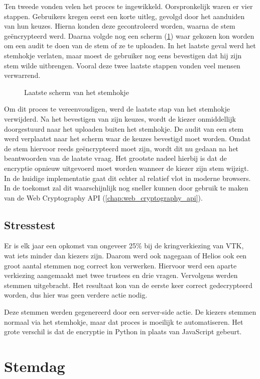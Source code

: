 \npar Ten tweede vonden velen het proces te ingewikkeld. Oorspronkelijk waren er vier stappen. Gebruikers kregen eerst een korte uitleg, gevolgd door het aanduiden van hun keuzes. Hierna konden deze gecontroleerd worden, waarna de stem ge\"encrypteerd werd. Daarna volgde nog een scherm (\ref{fig:kv:booth_submit}) waar gekozen kon worden om een audit te doen van de stem of ze te uploaden. In het laatste geval werd het stemhokje verlaten, maar moest de gebruiker nog eens bevestigen dat hij zijn stem wilde uitbrengen. Vooral deze twee laatste stappen vonden veel mensen verwarrend.

\begin{figure}
  \caption{Laatste scherm van het stemhokje}
  \label{fig:kv:booth_submit}
\end{figure}

\npar Om dit proces te vereenvoudigen, werd de laatste stap van het stemhokje verwijderd. Na het bevestigen van zijn keuzes, wordt de kiezer onmiddellijk doorgestuurd naar het uploaden buiten het stemhokje. De audit van een stem werd verplaatst naar het scherm waar de keuzes bevestigd moet worden. Omdat de stem hiervoor reeds ge\"encrypteerd moet zijn, wordt dit nu gedaan na het beantwoorden van de laatste vraag. Het grootste nadeel hierbij is dat de encryptie opnieuw uitgevoerd moet worden wanneer de kiezer zijn stem wijzigt. In de huidige implementatie gaat dit echter al relatief vlot in moderne browsers. In de toekomst zal dit waarschijnlijk nog sneller kunnen door gebruik te maken van de Web Cryptography API (\ref{chap:web_cryptography_api}).

\subsection{Stresstest}

Er is elk jaar een opkomst van ongeveer 25\% bij de kringverkiezing van VTK, wat iets minder dan  kiezers zijn. Daarom werd ook nagegaan of Helios ook een groot aantal stemmen nog correct kon verwerken. Hiervoor werd een aparte verkiezing aangemaakt met twee trustees en drie vragen. Vervolgens werden  stemmen uitgebracht. Het resultaat kon van de eerste keer correct gedecrypteerd worden, dus hier was geen verdere actie nodig.

\npar Deze stemmen werden gegenereerd door een server-side actie. De kiezers stemmen normaal via het stemhokje, maar dat proces is moeilijk te automatiseren. Het grote verschil is dat de encryptie in Python in plaats van JavaScript gebeurt.

\section{Stemdag}
\label{sec:kv:stemdag}


